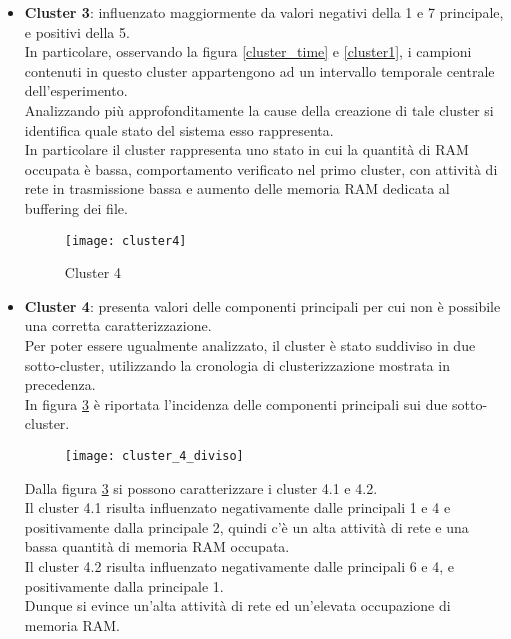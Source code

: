 \begin{itemize}
  \clearpage

  \begin{figure}[!htbp]
    \centering
    \texttt{[image: cluster3]}
    \caption{Cluster 3}
    \label{cluster3}
  \end{figure}

  \item \textbf{Cluster 3}: influenzato maggiormente da valori negativi della
  1 e 7 principale, e positivi della 5.\\
  In particolare, osservando la figura \ref{cluster_time} e \ref{cluster1}, i campioni contenuti
  in questo cluster appartengono ad un intervallo temporale centrale dell'esperimento.\\
  Analizzando più approfonditamente la cause della creazione di tale cluster si
  identifica quale stato del sistema esso rappresenta.\\
  In particolare il cluster rappresenta uno stato in cui la quantità di RAM occupata
  è bassa, comportamento verificato nel primo cluster, con attività di rete in trasmissione
  bassa e aumento delle memoria RAM dedicata al buffering dei file.

  \clearpage

  \begin{figure}[!htbp]
    \centering
    \texttt{[image: cluster4]}
    \caption{Cluster 4}
    \label{cluster4}
  \end{figure}

  \item \textbf{Cluster 4}: presenta valori delle componenti principali per cui non
  è possibile una corretta caratterizzazione.\\
  Per poter essere ugualmente analizzato, il cluster è stato suddiviso in due
  sotto-cluster, utilizzando la cronologia di clusterizzazione mostrata in
  precedenza.\\
  In figura \ref{cluster_4_diviso} è riportata l'incidenza delle componenti
  principali sui due sotto-cluster.\\

  \begin{figure}[!htbp]
    \centering
    \texttt{[image: cluster\_4\_diviso]}
    \caption{}
    \label{cluster_4_diviso}
  \end{figure}

  Dalla figura \ref{cluster_4_diviso} si possono caratterizzare i cluster 4.1 e 4.2.\\
  Il cluster 4.1 risulta influenzato  negativamente dalle principali 1 e 4
  e positivamente dalla principale 2, quindi c'è un alta attività di rete
  e una bassa quantità di memoria RAM occupata.\\
  Il cluster 4.2 risulta influenzato negativamente dalle principali 6 e 4,
  e positivamente dalla principale 1.\\
  Dunque si evince un'alta attività di rete ed un'elevata occupazione di memoria
  RAM.\\


\end{itemize}
